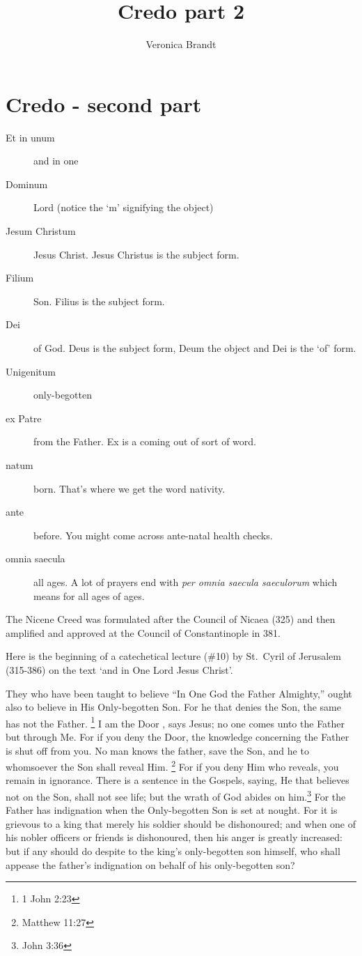 \documentclass[12pt,a4paper]{article}
\title{Credo part 2}
\author{Veronica Brandt}
\begin{document}
\autocompilegabc


\maketitle

\section{Credo - second part}

\begin{multicols}{2}
\begin{description}
\item[Et in unum] and in one
\item[Dominum] Lord (notice the `m' signifying the object)
\item[Jesum Christum] Jesus Christ.  Jesus Christus is the subject form.
\item[Filium] Son.  Filius is the subject form.
\item[Dei] of God.  Deus is the subject form, Deum the object and Dei is the `of' form.
\item[Unigenitum] only-begotten
\item[ex Patre] from the Father.  Ex is a coming out of sort of word.
\item[natum] born. That's where we get the word nativity.
\item[ante] before.  You might come across ante-natal health checks.
\item[omnia saecula] all ages.  A lot of prayers end with \emph{per omnia saecula saeculorum} which means for all ages of ages.
\end{description}

The Nicene Creed was formulated after the Council of Nicaea (325) and then amplified and approved at the Council of Constantinople in 381.

Here is the beginning of a catechetical lecture (\#10) by St.~Cyril of Jerusalem (315-386) on the text `and in One Lord Jesus Christ'.

They who have been taught to believe ``In One God the Father Almighty,'' ought also to believe in His Only-begotten Son. For he that denies the Son, the same has not the Father. \footnote{1 John 2:23} I am the Door , says Jesus; no one comes unto the Father but through Me. For if you deny the Door, the knowledge concerning the Father is shut off from you. No man knows the father, save the Son, and he to whomsoever the Son shall reveal Him. \footnote{Matthew 11:27} For if you deny Him who reveals, you remain in ignorance. There is a sentence in the Gospels, saying, He that believes not on the Son, shall not see life; but the wrath of God abides on him.\footnote{John 3:36} For the Father has indignation when the Only-begotten Son is set at nought. For it is grievous to a king that merely his soldier should be dishonoured; and when one of his nobler officers or friends is dishonoured, then his anger is greatly increased: but if any should do despite to the king's only-begotten son himself, who shall appease the father's indignation on behalf of his only-begotten son?

\end{multicols}
\end{document}
